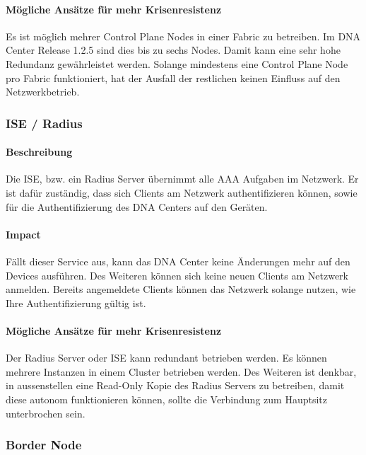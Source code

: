 \paragraph{Mögliche Ansätze für mehr Krisenresistenz}

Es ist möglich mehrer Control Plane Nodes in einer Fabric zu betreiben. Im DNA Center Release 1.2.5 sind dies bis zu sechs Nodes. Damit kann eine sehr hohe Redundanz gewährleistet werden. Solange mindestens eine Control Plane Node pro Fabric funktioniert, hat der Ausfall der restlichen keinen Einfluss auf den Netzwerkbetrieb.

\subsubsection{ISE / Radius}

\paragraph{Beschreibung}

Die ISE, bzw. ein Radius Server übernimmt alle AAA Aufgaben im Netzwerk. Er ist dafür zuständig, dass sich Clients am Netzwerk authentifizieren können, sowie für die Authentifizierung des DNA Centers auf den Geräten.

\paragraph{Impact}

Fällt dieser Service aus, kann das DNA Center keine Änderungen mehr auf den Devices ausführen. Des Weiteren können sich keine neuen Clients am Netzwerk anmelden. Bereits angemeldete Clients können das Netzwerk solange nutzen, wie Ihre Authentifizierung gültig ist.

\paragraph{Mögliche Ansätze für mehr Krisenresistenz}

Der Radius Server oder ISE kann redundant betrieben werden. Es können mehrere Instanzen in einem Cluster betrieben werden. Des Weiteren ist denkbar, in aussenstellen eine Read-Only Kopie des Radius Servers zu betreiben, damit diese autonom funktionieren können, sollte die Verbindung zum Hauptsitz unterbrochen sein.

\subsubsection{Border Node}

